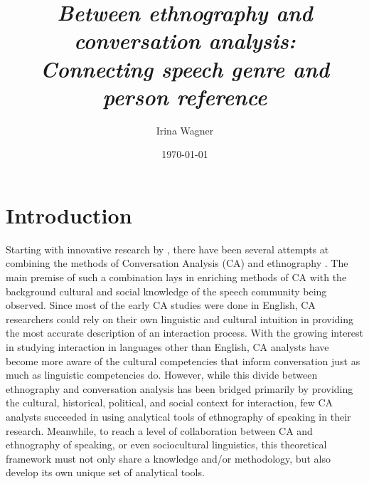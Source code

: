 \documentclass[12pt]{article}
\title{\textit{Between ethnography and conversation analysis: \\ Connecting speech genre and person reference}}
\author{\vspace{50pt} Irina Wagner}
\date{\today}
\begin{document}
\begin{titlingpage}
\setlength{\droptitle}{100pt}
\maketitle
\end{titlingpage}
\doublespacing
\indent

\section{Introduction}
Starting with innovative research by \textcite{moerman1988}, there have been several attempts at combining the methods of Conversation Analysis (CA) and ethnography \parencite{sidnell2008, dingemanse2014}. The main premise of such a combination lays in enriching methods of CA with the background cultural and social knowledge of the speech community being observed. Since most of the early CA studies were done in English, CA researchers could rely on their own linguistic and cultural intuition in providing the most accurate description of an interaction process. With the growing interest in studying interaction in languages other than English, CA analysts have become more aware of the cultural competencies that inform conversation just as much as linguistic competencies do. However, while this divide between ethnography and conversation analysis has been bridged primarily by providing the cultural, historical, political, and social context for interaction, few CA analysts succeeded in using analytical tools of ethnography of speaking in their research. Meanwhile, to reach a level of collaboration between CA and ethnography of speaking, or even sociocultural linguistics, this theoretical framework must not only share a knowledge and/or methodology, but also develop its own unique set of analytical tools.
\end{document}
